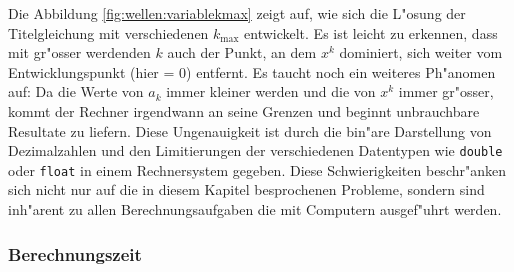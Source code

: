 Die Abbildung \ref{fig:wellen:variablekmax} zeigt auf, wie sich die L"osung 
der Titelgleichung mit verschiedenen $k_{\text{max}}$ entwickelt. Es ist leicht 
zu erkennen, dass mit gr"osser werdenden $k$ auch der Punkt, an dem $x^k$ 
dominiert, sich weiter vom Entwicklungspunkt (hier = 0) entfernt. Es taucht 
noch ein weiteres Ph"anomen auf: Da die Werte von $a_k$ immer kleiner werden 
und die von $x^k$ immer gr"osser, kommt der Rechner irgendwann an seine Grenzen 
und beginnt unbrauchbare Resultate zu liefern. Diese Ungenauigkeit ist durch 
die bin"are Darstellung von Dezimalzahlen und den Limitierungen der 
verschiedenen Datentypen wie \texttt{double} oder \texttt{float} in einem 
Rechnersystem gegeben. Diese Schwierigkeiten beschr"anken sich nicht nur auf 
die in diesem Kapitel besprochenen Probleme, sondern sind inh"arent zu allen 
Berechnungsaufgaben die mit Computern ausgef"uhrt werden.

\subsubsection{Berechnungszeit}



